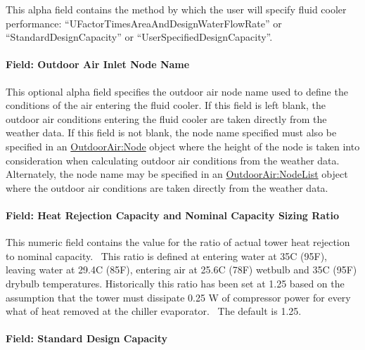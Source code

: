 This alpha field contains the method by which the user will specify fluid cooler performance: ``UFactorTimesAreaAndDesignWaterFlowRate'' or ``StandardDesignCapacity'' or ``UserSpecifiedDesignCapacity''.

\paragraph{Field: Outdoor Air Inlet Node Name}\label{field-outdoor-air-inlet-node-name-4}

This optional alpha field specifies the outdoor air node name used to define the conditions of the air entering the fluid cooler. If this field is left blank, the outdoor air conditions entering the fluid cooler are taken directly from the weather data. If this field is not blank, the node name specified must also be specified in an \hyperref[outdoorairnode]{OutdoorAir:Node} object where the height of the node is taken into consideration when calculating outdoor air conditions from the weather data. Alternately, the node name may be specified in an \hyperref[outdoorairnodelist]{OutdoorAir:NodeList} object where the outdoor air conditions are taken directly from the weather data.

\paragraph{Field: Heat Rejection Capacity and Nominal Capacity Sizing Ratio}\label{field-heat-rejection-capacity-and-nominal-capacity-sizing-ratio-3}

This numeric field contains the value for the ratio of actual tower heat rejection to nominal capacity.~ This ratio is defined at entering water at 35C (95F), leaving water at 29.4C (85F), entering air at 25.6C (78F) wetbulb and 35C (95F) drybulb temperatures. Historically this ratio has been set at 1.25 based on the assumption that the tower must dissipate 0.25 W of compressor power for every what of heat removed at the chiller evaporator.~ The default is 1.25.

\paragraph{Field: Standard Design Capacity}\label{field-standard-design-capacity}

